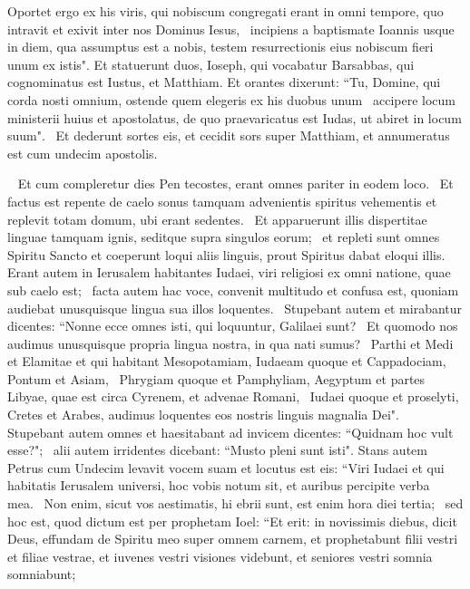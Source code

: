 \begin{biblechapter}
\verse Oportet ergo ex his viris, qui nobiscum congregati erant in omni tempore, quo intravit et exivit inter nos Dominus Iesus,  
\verse incipiens a baptismate Ioannis usque in diem, qua assumptus est a nobis, testem resurrectionis eius nobiscum fieri unum ex istis". 
\verse Et statuerunt duos, Ioseph, qui vocabatur Barsabbas, qui cognominatus est Iustus, et Matthiam.
\verse Et orantes dixerunt: “Tu, Domine, qui corda nosti omnium, ostende quem elegeris ex his duobus unum  
\verse accipere locum ministerii huius et apostolatus, de quo praevaricatus est Iudas, ut abiret in locum suum".  
\verse Et dederunt sortes eis, et cecidit sors super Matthiam, et annumeratus est cum undecim apostolis. 
\end{biblechapter}

\begin{biblechapter}   
\verse Et cum compleretur dies Pen tecostes, erant omnes pariter in eodem loco.  
\verse Et factus est repente de caelo sonus tamquam advenientis spiritus vehementis et replevit totam domum, ubi erant sedentes.  
\verse Et apparuerunt illis dispertitae linguae tamquam ignis, seditque supra singulos eorum;  
\verse et repleti sunt omnes Spiritu Sancto et coeperunt loqui aliis linguis, prout Spiritus dabat eloqui illis. 
\verse Erant autem in Ierusalem habitantes Iudaei, viri religiosi ex omni natione, quae sub caelo est;  
\verse facta autem hac voce, convenit multitudo et confusa est, quoniam audiebat unusquisque lingua sua illos loquentes.  
\verse Stupebant autem et mirabantur dicentes: “Nonne ecce omnes isti, qui loquuntur, Galilaei sunt?  
\verse Et quomodo nos audimus unusquisque propria lingua nostra, in qua nati sumus?  
\verse Parthi et Medi et Elamitae et qui habitant Mesopotamiam, Iudaeam quoque et Cappadociam, Pontum et Asiam,  
\verse Phrygiam quoque et Pamphyliam, Aegyptum et partes Libyae, quae est circa Cyrenem, et advenae Romani,  
\verse Iudaei quoque et proselyti, Cretes et Arabes, audimus loquentes eos nostris linguis magnalia Dei".  
\verse Stupebant autem omnes et haesitabant ad invicem dicentes: “Quidnam hoc vult esse?";  
\verse alii autem irridentes dicebant: “Musto pleni sunt isti". 
\verse Stans autem Petrus cum Undecim levavit vocem suam et locutus est eis: “Viri Iudaei et qui habitatis Ierusalem universi, hoc vobis notum sit, et auribus percipite verba mea.  
\verse Non enim, sicut vos aestimatis, hi ebrii sunt, est enim hora diei tertia;  
\verse sed hoc est, quod dictum est per prophetam Ioel: 
\verse “Et erit: in novissimis diebus, dicit Deus, effundam de Spiritu meo super omnem carnem, et prophetabunt filii vestri et filiae vestrae, et iuvenes vestri visiones videbunt, et seniores vestri somnia somniabunt; 

\end{biblechapter}
